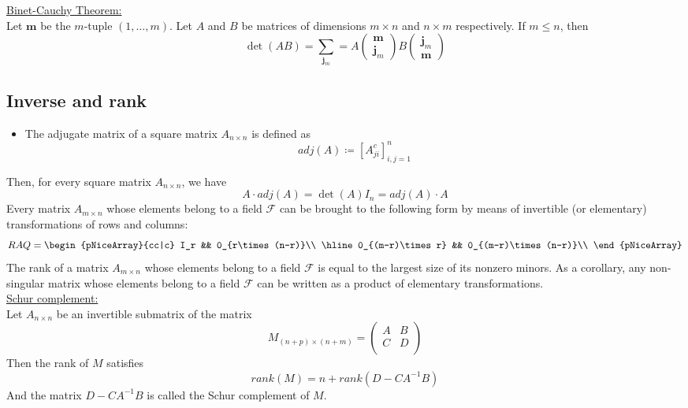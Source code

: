 \documentclass[12pt, openany]{report}
\theoremstyle{definition}
\begin{document}
\underline{Binet-Cauchy Theorem:}\\
Let \(\textbf{m}\) be the \(m\)-tuple \((1,\dots,m)\). Let \(A\) and \(B\) be matrices of dimensions \(m\times n\) and \(n\times m\) respectively. If \(m\le n\), then 
\begin{equation}
    \det(AB) = \sum_{\textbf{j}_m} = A\begin{pmatrix}
        \textbf{m}\\ \textbf{j}_m
    \end{pmatrix} B\begin{pmatrix}
        \textbf{j}_m\\ \textbf{m}
    \end{pmatrix}
\end{equation}
\subsection{Inverse and rank}
\begin{itemize}
    \item The adjugate matrix of a square matrix \(A_{n\times n}\) is defined as \[adj(A) \coloneqq [A_{ji}^c]_{i,j=1}^n\]
\end{itemize}
Then, for every square matrix \(A_{n\times n}\), we have
\begin{equation}
    A\cdot adj(A) = \det(A) I_n = adj(A)\cdot A
\end{equation}
Every matrix \(A_{m\times n}\) whose elements belong to a field \(\mathcal{F}\) can be brought to the following form by means of invertible (or elementary) transformations of rows and columns:
\begin{equation}
    RAQ = \begin{pNiceArray}{cc|c}
    I_r && 0_{r\times (n-r)}\\
  \hline
  0_{(m-r)\times r} && 0_{(m-r)\times (n-r)}\\
\end{pNiceArray}
\end{equation}
The rank of a matrix \(A_{m\times n}\) whose elements belong to a field \(\mathcal{F}\) is equal to the largest size of its nonzero minors. As a corollary, any non-singular matrix whose elements belong to a field \(\mathcal{F}\) can be written as a product of elementary transformations.\\

\underline{Schur complement:}\\
Let \(A_{n\times n}\) be an invertible submatrix of the matrix \[M_{(n+p)\times (n+m)} = \begin{pmatrix}
    A & B\\ C & D\\
\end{pmatrix}\]
Then the rank of \(M\) satisfies 
\begin{equation}
    rank(M) = n + rank(D-CA^{-1}B)
\end{equation}
And the matrix \(D-CA^{-1}B\) is called the Schur complement of \(M\). 
\end{document}
